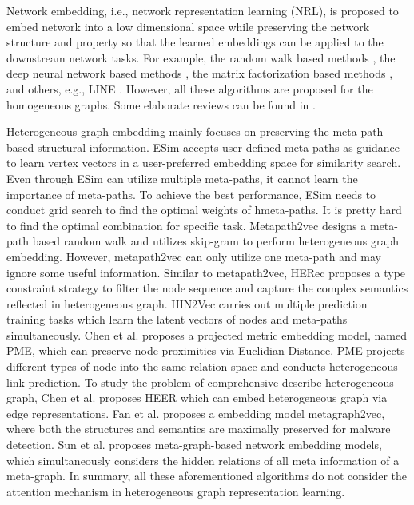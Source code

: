 Network embedding, i.e., network representation learning (NRL), is proposed to embed network into a low dimensional space while preserving the network structure and property so that the learned embeddings can be applied to the downstream network tasks.
For example, the random walk based methods \cite{perozzi2014deepwalk,grover2016node2vec}, the deep neural network based methods \cite{wang2016structural}, the matrix factorization based methods \cite{hope,mnmf}, and others, e.g., LINE \cite{Tang2015LINELI}. However, all these algorithms are proposed for the homogeneous graphs. Some elaborate reviews
can be found in \cite{cui2018survey,goyal2017graph}.

Heterogeneous graph embedding mainly focuses on preserving the meta-path based structural information.
ESim \cite{Shang2016MetaPathGE} accepts user-defined meta-paths as guidance to learn vertex vectors in a user-preferred embedding space for similarity search. 
Even through ESim can utilize multiple meta-paths, it cannot learn the importance of meta-paths. To achieve the best performance, ESim needs to conduct grid search to find the optimal weights of hmeta-paths. It is pretty hard to find the optimal combination for specific task.
Metapath2vec \cite{Dong2017metapath2vecSR} designs a meta-path based random walk 
and utilizes skip-gram to perform heterogeneous graph embedding. However, metapath2vec can only utilize one meta-path and may ignore some useful information.
Similar to metapath2vec, HERec \cite{HERec} proposes a type constraint strategy to filter the node sequence and capture the complex semantics reflected in heterogeneous graph.
HIN2Vec \cite{Fu2017HIN2VecEM} carries out multiple prediction training tasks which learn the latent vectors of nodes and meta-paths simultaneously. Chen et al. \cite{chen2018pme} proposes a projected metric embedding model, named PME, which can preserve node proximities via Euclidian Distance. PME projects different types of node into the same relation space and conducts
heterogeneous link prediction.
To study the problem of comprehensive describe heterogeneous graph, Chen et al. \cite{shi2018easing} proposes HEER which can embed heterogeneous graph via edge representations. Fan et al. \cite{fan2018gotcha} proposes a embedding model metagraph2vec, where both the structures and semantics are maximally preserved for malware detection.
Sun et al. \cite{sun2018joint} proposes meta-graph-based network embedding models, which simultaneously considers
the hidden relations of all meta information of a meta-graph.
In summary, all these aforementioned algorithms do not consider the attention mechanism in heterogeneous graph representation learning.















